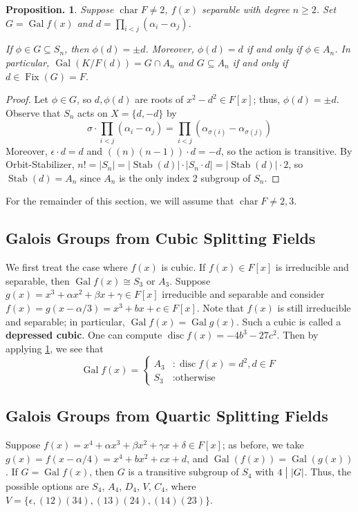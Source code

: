 \documentclass[11pt, a4paper]{memoir}
\newcommand{\mbf}[1]{{\boldmath\bfseries #1}}
\renewcommand{\div}{\bigm|}
\theoremstyle{change}
\newtheorem{proposition}[theorem]{Proposition.}
\theoremstyle{plain}
\theoremstyle{nonumberplain}
\newtheorem{proof}{Proof}
\DeclareMathOperator{\chr}{char}
\DeclareMathOperator{\disc}{disc}
\DeclareMathOperator{\Fix}{Fix}
\DeclareMathOperator{\Gal}{Gal}
\DeclareMathOperator{\Stab}{Stab}
\numberwithin{equation}{section}
\begin{document}
\begin{proposition}\label{prop:disc-an}
    Suppose $\chr F\neq 2$, $f(x)$ separable with degree $n\geq 2$.
    Set $G=\Gal f(x)$ and $d=\prod_{i<j}(\alpha_i-\alpha_j)$.

    If $\phi\in G\subseteq S_n$, then $\phi(d)=\pm d$.
    Moreover, $\phi(d)=d$ if and only if $\phi\in A_n$.
    In particular, $\Gal(K/F(d))=G\cap A_n$ and $G\subseteq A_n$ if and only if $d\in\Fix(G)=F$.
\end{proposition}
\begin{proof}
    Let $\phi\in G$, so $d,\phi(d)$ are roots of $x^2-d^2\in F[x]$; thus, $\phi(d)=\pm d$.
    Observe that $S_n$ acts on $X=\{d,-d\}$ by
    \begin{equation*}
        \sigma\cdot\prod_{i<j}(\alpha_i-\alpha_j)=\prod_{i<j}(\alpha_{\sigma(i)}-\alpha_{\sigma(j)})
    \end{equation*}
    Moreover, $\epsilon\cdot d=d$ and $((n)(n-1))\cdot d=-d$, so the action is transitive.
    By Orbit-Stabilizer, $n!=|S_n|=|\Stab(d)|\cdot|S_n\cdot d|=|\Stab(d)|\cdot 2$, so $\Stab(d)=A_n$ since $A_n$ is the only index 2 subgroup of $S_n$.
\end{proof}
For the remainder of this section, we will assume that $\chr F\neq 2,3$.
\subsection{Galois Groups from Cubic Splitting Fields}
We first treat the case where $f(x)$ is cubic.
If $f(x)\in F[x]$ is irreducible and separable, then $\Gal f(x)\cong S_3$ or $A_3$.
Suppose $g(x)=x^3+\alpha x^2+\beta x+\gamma\in F[x]$ irreducible and separable and consider $f(x)=g(x-\alpha/3)=x^3+bx+c\in F[x]$.
Note that $f(x)$ is still irreducible and separable; in particular, $\Gal f(x)=\Gal g(x)$.
Such a cubic is called a \mbf{depressed cubic}.
One can compute $\disc f(x)=-4b^3-27c^2$.
Then by applying \cref{prop:disc-an}, we see that
\begin{equation*}
    \Gal f(x)=
    \begin{cases}
        A_3&:\disc f(x)=d^2, d\in F\\
        S_3&:\text{otherwise}
    \end{cases}
\end{equation*}
\subsection{Galois Groups from Quartic Splitting Fields}
Suppose $f(x)=x^4+\alpha x^3+\beta x^2+\gamma x+\delta\in F[x]$; as before, we take $g(x)=f(x-\alpha/4)=x^4+bx^2+cx+d$, and $\Gal(f(x))=\Gal(g(x))$.
If $G=\Gal f(x)$, then $G$ is a transitive subgroup of $S_4$ with $4\div|G|$.
Thus, the possible options are $S_4$, $A_4$, $D_4$, $V$, $C_4$, where $V=\{\epsilon,(12)(34),(13)(24),(14)(23)\}$.
\end{document}
